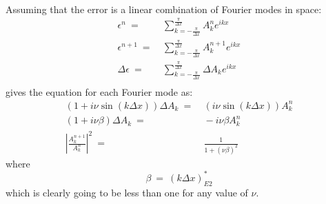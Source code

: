 \documentclass[conf]{new-aiaa}
\begin{document}
{{\begin{equation}
\begin{split}
	\end{split}
\end{equation}
Assuming that the error is a linear combination of Fourier modes in space: 
\begin{equation}
	\begin{split}
		\label{eq:Error_Fourier}
  			\epsilon^n~=&~\sum_{k=-\frac{\pi}{\Delta{x}}}^{\frac{\pi}{\Delta{x}}}{A_k^n e^{ikx}} \\
  			\epsilon^{n+1}~=&~\sum_{k=-\frac{\pi}{\Delta{x}}}^{\frac{\pi}{\Delta{x}}}{A_k^{n+1} e^{ikx}} \\
  			\Delta{\epsilon}~=&~\sum_{k=-\frac{\pi}{\Delta{x}}}^{\frac{\pi}{\Delta{x}}}{\Delta{A_k} e^{ikx}} \\
	\end{split}
\end{equation}
gives the equation for each Fourier mode as:
\begin{equation}
	\begin{split}
		\label{eq:Fourier_Mode}
  			\left(1+i\nu\sin(k\Delta{x})\right)\Delta{A_k}~=&~\left(i\nu\sin(k\Delta{x})\right)A_k^n \\
  			(1+i\nu\beta)\Delta{A_k}~=&~-i\nu\beta{A_k^n} \\
  			\left|\frac{A_k^{n+1}}{A_k^{n}} \right|^2~=&~\frac{1}{1+\left(\nu\beta\right)^2}
	\end{split}
\end{equation}
where
\begin{equation*}
	\beta~=~\left(k\Delta{x}\right)^*_{E2}
\end{equation*}
which is clearly going to be less than one for any value of $\nu$. 
}

}
\end{document}

